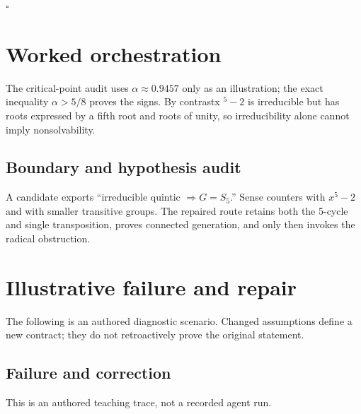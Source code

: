 \documentclass[preprint,12pt,aps,pra,showkeys,amsmath,amssymb,superscriptaddress,floatfix]{revtex4-2}
\theoremstyle{definition}
\theoremstyle{remark}
\begin{document}
\hfill$\square$

\section{Worked orchestration}

The critical-point audit uses \(\alpha \approx 0.9457\) only as an
illustration; the exact inequality \(\alpha >5/8\) proves the signs. By
contrastx \(^{5}-2\) is irreducible but has roots expressed by a fifth
root and roots of unity, so irreducibility alone cannot imply
nonsolvability.

\subsection{Boundary and hypothesis audit}

A candidate exports ``irreducible quintic \(\Longrightarrow G=S_{5}\).''
Sense counters with \(x^{5}-2\) and with smaller transitive groups. The
repaired route retains both the 5-cycle and single transposition, proves
connected generation, and only then invokes the radical obstruction.

\section{Illustrative failure and repair}

The following is an authored diagnostic scenario. Changed assumptions
define a new contract; they do not retroactively prove the original
statement.

\subsection{Failure and correction}
This is an authored teaching trace, not a recorded agent run.
\end{document}
